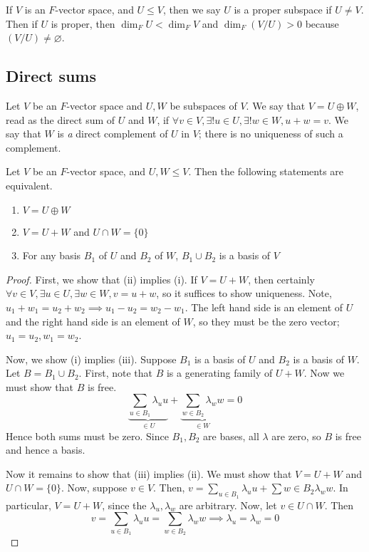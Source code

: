 \begin{remark}
	If \( V \) is an \( F \)-vector space, and \( U \leq V \), then we say \( U \) is a proper subspace if \( U \neq V \).
	Then if \( U \) is proper, then \( \dim_F U < \dim_F V \) and \( \dim_F ( V / U ) > 0 \) because \( (V/U) \neq \varnothing \).
\end{remark}

\subsection{Direct sums}
\begin{definition}
	Let \( V \) be an \( F \)-vector space and \( U, W \) be subspaces of \( V \).
	We say that \( V = U \oplus W \), read as the direct sum of \( U \) and \( W \), if \( \forall v \in V, \exists!
	u \in U, \exists!
	w \in W, u + w = v \).
	We say that \( W \) is \textit{a} direct complement of \( U \) in \( V \); there is no uniqueness of such a complement.
\end{definition}
\begin{lemma}
	Let \( V \) be an \( F \)-vector space, and \( U, W \leq V \).
	Then the following statements are equivalent.
	\begin{enumerate}
		\item \( V = U \oplus W \)
		\item \( V = U + W \) and \( U \cap W = \{0\} \)
		\item For any basis \( B_1 \) of \( U \) and \( B_2 \) of \( W \), \( B_1 \cup B_2 \) is a basis of \( V \)
	\end{enumerate}
\end{lemma}
\begin{proof}
	First, we show that (ii) implies (i).
	If \( V = U + W \), then certainly \( \forall v \in V, \exists u \in U, \exists w \in W, v = u + w \), so it suffices to show uniqueness.
	Note, \( u_1 + w_1 = u_2 + w_2 \implies u_1 - u_2 = w_2 - w_1 \).
	The left hand side is an element of \( U \) and the right hand side is an element of \( W \), so they must be the zero vector; \( u_1 = u_2, w_1 = w_2 \).

	Now, we show (i) implies (iii).
	Suppose \( B_1 \) is a basis of \( U \) and \( B_2 \) is a basis of \( W \).
	Let \( B = B_1 \cup B_2 \).
	First, note that \( B \) is a generating family of \( U + W \).
	Now we must show that \( B \) is free.
	\[
		\underbrace{\sum_{u \in B_1} \lambda_u u}_{\in U} + \underbrace{\sum_{w \in B_2} \lambda_w w}_{\in W} = 0
	\]
	Hence both sums must be zero.
	Since \( B_1, B_2 \) are bases, all \( \lambda \) are zero, so \( B \) is free and hence a basis.

	Now it remains to show that (iii) implies (ii).
	We must show that \( V = U + W \) and \( U \cap W = \{0\} \).
	Now, suppose \( v \in V \).
	Then, \( v = \sum_{u \in B_1} \lambda_u u + \sum{w \in B_2} \lambda_w w \).
	In particular, \( V = U + W \), since the \( \lambda_u, \lambda_w \) are arbitrary.
	Now, let \( v \in U \cap W \).
	Then
	\[
		v = \sum_{u \in B_1} \lambda_u u = \sum_{w \in B_2} \lambda_w w \implies \lambda_u = \lambda_w = 0
	\]
\end{proof}

